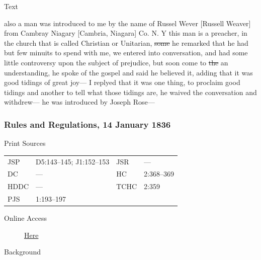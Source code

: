 				\begin{description}
					\item[Text]
				\end{description}
				
					also a man was introduced to me by the name of Russel Wever [Russell Weaver] from Cambray Niagary [Cambria, Niagara] Co. N. Y this man is a preacher, in the church that is called Christian or Unitarian, \sout{some} he remarked that he had but few minuits to spend with me, we entered into conversation, and had some little controversy upon the subject of prejudice, but soon come to \sout{the} an understanding, he spoke of the gospel and said he believed it, adding that it was good tidings of great joy--- I replyed that it was one thing, to proclaim good tidings and another to tell what those tidings are, he waived the conversation and withdrew--- he was introduced by Joseph Rose---
					
		\subsubsection{Rules and Regulations, 14 January 1836}
			\label{EMS-1836-JS-14-JAN-1836}
			
			\begin{description}
					\item[Print Sources]
				\end{description}

					\begin{tabular}{p{0.5in}p{1in}p{0.5in}p{1in}}
					JSP	 	& D5:143--145; J1:152--153		& JSR 		& --- \\
					DC	 	& ---				& HC 		& 2:368--369 \\
					HDDC 	& ---				& TCHC 		& 2:359 \\
					PJS 	& 1:193--197			& 	 		&  \\
					\end{tabular}
				
				\begin{description}
					\item[Online Access] \href{https://www.josephsmithpapers.org/paper-summary/rules-and-regulations-14-january-1836/1}{Here}
				\end{description}
				
				\begin{description}
					\item[Background]
				\end{description}
				
